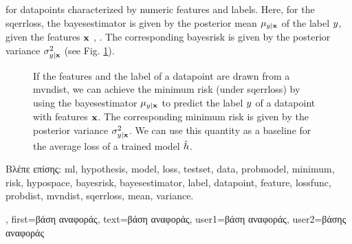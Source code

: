 {{	for \gls{datapoint}s characterized by numeric \gls{feature}s and \gls{label}s.
	Here, for the \gls{sqerrloss}, the \gls{bayesestimator} is given by the posterior 
	\gls{mean} $\mu_{y|{\bf x}}$ of the \gls{label} $y$, given the 
	\gls{feature}s ${\bf x}$ \cite{LC}, \cite{GrayProbBook}. The corresponding \gls{bayesrisk} 
	is given by the posterior \gls{variance} 
	$\sigma^{2}_{y|{\bf x}}$ (see Fig. \ref{fig_post_baseline_dict}).
	\begin{figure}[H]
		\begin{center}
		\end{center}
		\caption{If the \gls{feature}s and the \gls{label} of a \gls{datapoint} are drawn from a \gls{mvndist}, we 
		can achieve the \gls{minimum} \gls{risk} (under \gls{sqerrloss}) by using the \gls{bayesestimator} $\mu_{y|{\bf x}}$ 
		to predict the \gls{label} $y$ of a \gls{datapoint} with \gls{feature}s ${\bf x}$. The corresponding 
		\gls{minimum} \gls{risk} is given by the posterior \gls{variance} $\sigma^{2}_{y|{\bf x}}$. We can use 
		this quantity as a baseline for the average \gls{loss} of a trained \gls{model} $\hat{h}$. \label{fig_post_baseline_dict}}
	\end{figure}
	\foreignlanguage{greek}{Βλέπε επίσης:} \gls{ml}, \gls{hypothesis}, \gls{model}, \gls{loss}, \gls{testset}, \gls{data}, \gls{probmodel}, \gls{minimum}, 
	\gls{risk}, \gls{hypospace}, \gls{bayesrisk}, \gls{bayesestimator}, \gls{label}, \gls{datapoint}, \gls{feature}, \gls{lossfunc}, \gls{probdist}, \gls{mvndist}, 
	\gls{sqerrloss}, \gls{mean}, \gls{variance}.},
    first={\foreignlanguage{greek}{βάση αναφοράς}},
    text={\foreignlanguage{greek}{βάση αναφοράς}},
    user1={\foreignlanguage{greek}{βάση αναφοράς}}, %
    user2={\foreignlanguage{greek}{βάσης αναφοράς}} %
}

